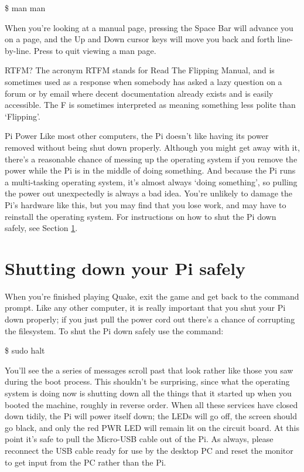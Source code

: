 \begin{ttoutenv}
\$ man man
\end{ttoutenv}

\noindent When you're looking at a manual page, pressing the Space Bar will advance you on a page, and the Up and Down cursor keys will move you back and forth line-by-line. Press  to quit viewing a man page.

\begin{diversion}{RTFM?}
The acronym RTFM stands for Read The Flipping Manual, and is sometimes used as a response when somebody has asked a lazy question on a forum or by email where decent documentation already exists and is easily accessible. The F is sometimes interpreted as meaning something less polite than `Flipping'.
\end{diversion}

\FloatBarrier

\begin{danger}{Pi Power}
Like most other computers, the Pi doesn't like having its power removed without being shut down properly. Although you might get away with it, there's a reasonable chance of messing up the operating system if you remove the power while the Pi is in the middle of doing something. And because the Pi runs a multi-tasking operating system, it's almost always `doing something', so pulling the power out unexpectedly is always a bad idea. You're unlikely to damage the Pi's hardware like this, but you may find that you lose work, and may have to reinstall the operating system. For instructions on how to shut the Pi down safely, see Section \ref{section:shutdown}.
\end{danger}

\section{Shutting down your Pi safely}
\label{section:shutdown}

When you're finished playing Quake, exit the game and get back to the command prompt. Like any other computer, it is really important that you shut your Pi down properly; if you just pull the power cord out there's a chance of corrupting the filesystem. To shut the Pi down safely use the  command:

\begin{ttoutenv}
\$ sudo halt
\end{ttoutenv}

\noindent You'll see the a series of messages scroll past that look rather like those you saw during the boot process. This shouldn't be surprising, since what the operating system is doing now is shutting down all the things that it started up when you booted the machine, roughly in reverse order. When all these services have closed down tidily, the Pi will power itself down; the LEDs will go off, the screen should go black, and only the red PWR LED will remain lit on the circuit board. At this point it's safe to pull the Micro-USB cable out of the Pi. As always, please reconnect the USB cable ready for use by the desktop PC and reset the monitor to get input from the PC rather than the Pi.

